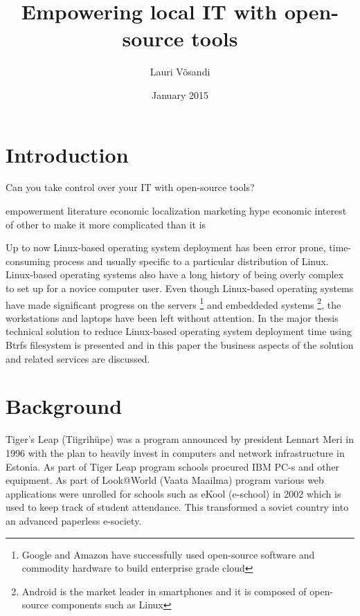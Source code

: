 \documentclass{article}
\title{Empowering local IT with open-source tools}
\author{Lauri Võsandi}
\date{January 2015}
\begin{document}
\maketitle

\section{Introduction}

Can you take control over your IT with open-source tools?

empowerment literature
economic 
localization
marketing hype
economic interest of other to make it more complicated than it is

Up to now Linux-based operating system deployment has been
error prone, time-consuming process and usually specific to
a particular distribution of Linux.
Linux-based operating systems also have a long history
of being overly complex to set up for a novice computer user.
Even though Linux-based operating systems have made significant
progress on the servers
\footnote{Google and Amazon have successfully used open-source software
and commodity hardware to build enterprise grade cloud}
and embeddeded systems
\footnote{Android is the market leader in smartphones and it is composed of open-source components such as Linux},
the workstations and laptops have been left without attention.
In the major thesis technical solution to reduce
Linux-based operating system deployment time using
Btrfs filesystem is presented and in this paper the business aspects
of the solution and related services are discussed.


\section{Background}

Tiger's Leap (Tiigrihüpe) was a program announced
by president Lennart Meri in 1996 with the plan to heavily invest
in computers and network infrastructure in Estonia.
As part of Tiger Leap program schools procured IBM PC-s and
other equipment.
As part of Look@World (Vaata Maailma) program
various web applications were unrolled for schools such as
eKool (e-school) in 2002 which is used to keep track of student attendance.
This transformed a soviet country into an advanced paperless e-society.
\end{document}
